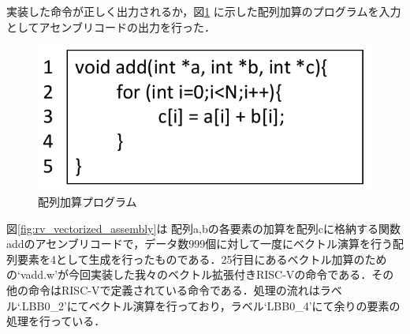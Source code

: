
実装した命令が正しく出力されるか，図\ref{fig:add_array_c}
に示した配列加算のプログラムを入力としてアセンブリコードの出力を行った．

\begin{figure}[tb]
    \centering
    \includegraphics[scale=0.6]{image/add_array_c.pdf}
    \caption{配列加算プログラム}
    \label{fig:add_array_c}
\end{figure}

図\ref{fig:rv_vectorized_assembly}は
配列a,bの各要素の加算を配列cに格納する関数addのアセンブリコードで，データ数999個に対して一度にベクトル演算を行う配列要素を4として生成を行ったものである．25行目にあるベクトル加算のための`vadd.w'が今回実装した我々のベクトル拡張付きRISC-Vの命令である．その他の命令はRISC-Vで定義されている命令である．処理の流れはラベル`.LBB0\_2'にてベクトル演算を行っており，ラベル`LBB0\_4'にて余りの要素の処理を行っている．

